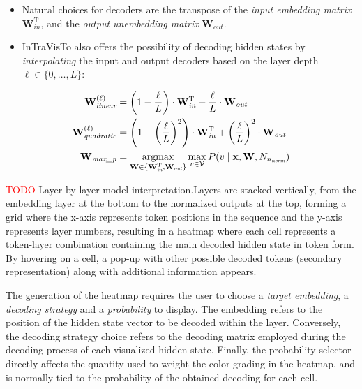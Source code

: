 \documentclass[aspectratio=169, 12pt]{beamer}
\newcommand{\gbm}[1]{\bm{\mathbf{#1}}} %
\newcommand{\T}{\mathrm{T}} %
\begin{document}
    \begin{frame}{}
        \begin{itemize}
            \item Natural choices for decoders are the transpose of the \emph{input embedding matrix} $\gbm{W}_{\textit{in}}^\T$, and the \emph{output unembedding matrix} $\gbm{W}_{\textit{out}}$.
            \item InTraVisTo also offers the possibility of decoding hidden states by \emph{interpolating} the input and output decoders based on the layer depth $\ell\in\{0,\ldots,L\}$:
        \end{itemize}
        \begin{equation*}
        \begin{aligned}
                \gbm{W}_{\textit{linear}}^{(\ell)} &=\left(1-\frac{\ell}{L}\right) \cdot \gbm{W}_{\textit{in}}^\T + \frac{\ell}{L} \cdot \gbm{W}_{\textit{out}} \\
                \gbm{W}_{\textit{quadratic}}^{(\ell)} &=\left(1-\left(\frac{\ell}{L}\right)^2\right) \cdot \gbm{W}_{\textit{in}}^\T + \left(\frac{\ell}{L}\right)^2 \cdot \gbm{W}_{\textit{out}} \\
                \gbm{W}_{\textit{max\_p}} &=\operatornamewithlimits{argmax}_{\gbm{W} \in \{\gbm{W}_{\textit{in}}^\T, \gbm{W}_{\textit{out}}\}} \operatornamewithlimits{max}_{v \in \mathcal{V}} P(v \mid \gbm{x}, \gbm{W}, N_{n_{\textit{norm}}}) \\
        \end{aligned}
        \end{equation*}
    \end{frame}

    \begin{frame}{}
        \textcolor{red}{TODO}
        Layer-by-layer model interpretation.Layers are stacked vertically, from the embedding layer at the bottom to the normalized outputs at the top, forming a grid where the x-axis represents token positions in the sequence and the y-axis represents layer numbers, resulting in a heatmap where each cell represents a token-layer combination containing the main decoded hidden state in token form.
        By hovering on a cell, a pop-up with other possible decoded tokens (secondary representation) along with additional information appears.

        The generation of the heatmap requires the user to choose a \emph{target embedding}, a \emph{decoding strategy} and a \emph{probability} to display.
        The embedding refers to the position of the hidden state vector to be decoded within the layer.
        Conversely, the decoding strategy choice refers to the decoding matrix employed during the decoding process of each visualized hidden state.
        Finally, the probability selector directly affects the quantity used to weight the color grading in the heatmap, and is normally tied to the probability of the obtained decoding for each cell.
    \end{frame}
\end{document}
